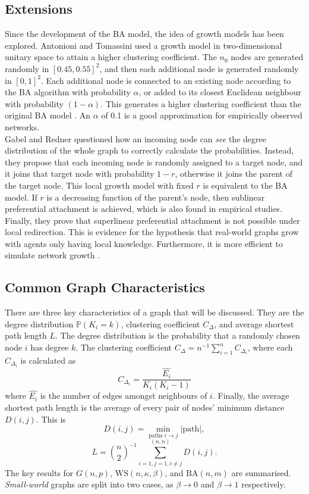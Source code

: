 \subsection{Extensions}
Since the development of the BA model, the idea of growth models has been explored. Antonioni and Tomassini \cite{RN51} used a growth model in two-dimensional unitary space to attain a higher clustering coefficient. The $n_0$ nodes are generated randomly in $[0.45,0.55]^2$, and then each additional node is generated randomly in $[0,1]^2$. Each additional node is connected to an existing node according to the BA algorithm with probability $\alpha$, or added to its closest Euclidean neighbour with probability $(1-\alpha)$. This generates a higher clustering coefficient than the original BA model \cite{RN51}.  An $\alpha$ of 0.1 is a good approximation for empirically observed networks. \\  

Gabel and Redner \cite{RN60} questioned how an incoming node can \emph{see} the degree distribution of the whole graph to correctly calculate the probabilities. Instead, they propose that each incoming node is randomly assigned to a target node, and it joins that target node with probability $1-r$, otherwise it joins the parent of the target node. This local growth model with fixed $r$ is equivalent to the BA model. If $r$ is a decreasing function of the parent's node, then sublinear preferential attachment is achieved, which is also found in empirical studies. Finally, they prove that superlinear preferential attachment is not possible under local redirection. This is evidence for the hypothesis that real-world graphs grow with agents only having local knowledge. Furthermore, it is more efficient to simulate network growth \cite{RN60}. 



\subsection{Common Graph Characteristics} \label{CGC}

There are three key characteristics of a graph that will be discussed. They are the degree distribution $\mathbb P(K_i = k)$, clustering coefficient $C_\Delta$, and average shortest path length $L$. The degree distribution is the probability that a randomly chosen node $i$ has degree $k$. The clustering coefficient $C_\Delta = n^{-1}\sum_{i=1}^n C_{\Delta_i}$, where each $C_{\Delta_i}$ is calculated as $$
 C_{\Delta_i} = \frac{\hat{E_i}}{K_i(K_i-1)}$$ where $\hat{E_i}$ is the number of edges amongst neighbours of $i$. Finally, the average shortest path length is the average of every pair of nodes' minimum distance $D(i,j)$. This is $$D(i,j) = \min_{\text{paths  } i \to j} |\text{path}|,$$ $$L = {n\choose 2} ^{-1}\sum_{i=1, j=1, i \neq j}^{(n,n)} D(i,j). $$ The key results for $G(n,p)$, $\mathrm{WS}(n,\kappa,\beta)$, and $\mathrm{BA}(n,m)$ are summarised. \emph{Small-world} graphs are split into two cases, as $\beta \to 0$ and $\beta \to 1$ respectively. 
 
